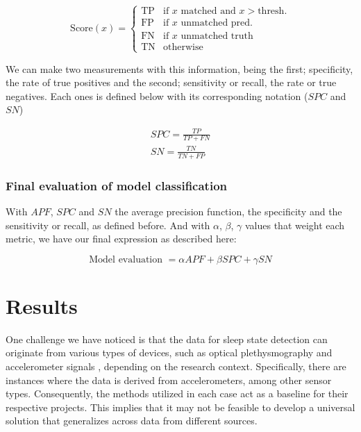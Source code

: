 \documentclass{article}
\begin{document}
\[
\text{Score}(x) = 
\begin{cases} 
\text{TP} & \text{if }x \text{ matched and } x > \text{thresh.} \\
\text{FP} & \text{if }x \text{ unmatched pred.} \\
\text{FN} & \text{if }x \text{ unmatched truth} \\
\text{TN} & \text{otherwise}
\end{cases}
\]

We can make two measurements with this information, being the first; specificity, the rate of true positives and the second; sensitivity or recall, the rate or true negatives. Each ones is defined below with its corresponding notation ($SPC$ and $SN$)

\begin{gather}
  SPC = \frac{TP}{TP + FN} \\
  SN = \frac{TN}{TN + FP}
\end{gather}

\subsubsection{Final evaluation of model classification}

With $APF$, $SPC$ and $SN$ the average precision function, the specificity and the sensitivity or recall, as defined before. And with $\alpha$, $\beta$, $\gamma$ values that weight each metric, we have our final expression as described here:

\begin{equation*}
\text{Model evaluation } = \alpha APF + \beta SPC + \gamma SN 
\end{equation*}

\vspace{.5em}



\section{Results}

One challenge we have noticed is that the data for sleep state detection can originate from various types of devices, such as optical plethysmography and accelerometer signals \cite{Beattie_2017}\cite{Fedorin2019}, depending on the research context. Specifically, there are instances where the data is derived from accelerometers, among other sensor types. Consequently, the methods utilized in each case act as a baseline for their respective projects. This implies that it may not be feasible to develop a universal solution that generalizes across data from different sources.
\end{document}
